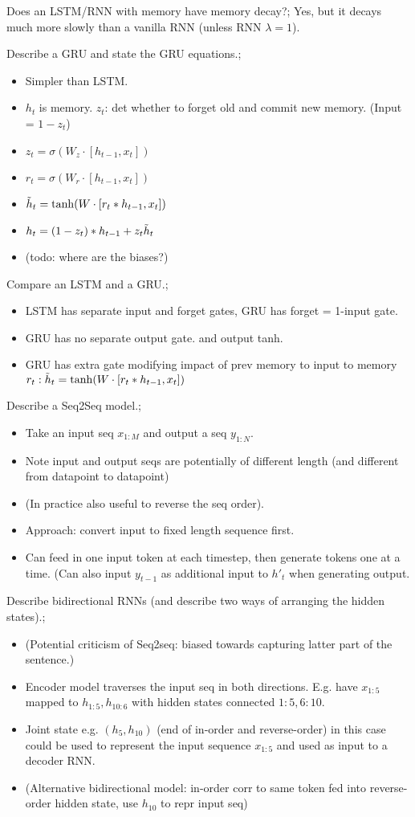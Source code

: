 \documentclass{article}
\begin{document}
Does an LSTM/RNN with memory have memory decay?; Yes, but it decays much more slowly than a vanilla RNN (unless RNN $\lambda = 1$).


Describe a GRU and state the GRU equations.; \begin{itemize} \item Simpler than LSTM.  \item $h_t$ is memory. $z_t$: det whether to forget old and commit new memory. (Input = $1-z_t$) \item $z_t = \sigma(W_z \cdot [h_{t-1}, x_t])$ \item $r_t = \sigma(W_r \cdot [h_{t-1}, x_t])$ \item $\Tilde{h}_t = \tanh(W\cdot [r_t * h_{t-1}, x_t])$ \item $h_t = (1-z_t)*h_{t-1} + z_t \Tilde{h}_t$ \item (todo: where are the biases?) \end{itemize}

Compare an LSTM and a GRU.; \begin{itemize} \item LSTM has separate input and forget gates, GRU has forget = 1-input gate. \item GRU has no separate output gate. and output tanh. \item GRU has extra gate modifying impact of prev memory to input to memory $r_t: \Tilde{h}_t = \tanh(W\cdot [r_t * h_{t-1}, x_t])$ \end{itemize} 

Describe a Seq2Seq model.; \begin{itemize} \item Take an input seq $x_{1:M}$ and output a seq $y_{1:N}$.  \item Note input and output seqs are potentially of different length (and different from datapoint to datapoint) \item (In practice also useful to reverse the seq order). \item Approach: convert input to fixed length sequence first. \item Can feed in one input token at each timestep, then generate tokens one at a time. (Can also input $y_{t-1}$ as additional input to $h'_t$ when generating output. \end{itemize}

Describe bidirectional RNNs (and describe two ways of arranging the hidden states).; \begin{itemize} \item (Potential criticism of Seq2seq: biased towards capturing latter part of the sentence.) \item Encoder model traverses the input seq in both directions. E.g. have $x_{1:5}$ mapped to $h_{1:5}, h_{10:6}$ with hidden states connected $1:5, 6:10$.  \item Joint state e.g. $(h_5, h_{10})$ (end of in-order and reverse-order) in this case could be used to represent the input sequence $x_{1:5}$ and used as input to a decoder RNN. \item (Alternative bidirectional model: in-order corr to same token fed into reverse-order hidden state, use $h_{10}$ to repr input seq) \end{itemize}
\end{document}
